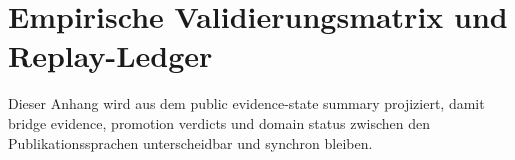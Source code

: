 \section{Empirische Validierungsmatrix und Replay-Ledger}
\label{sec:oc-core-1-3-empirical-validation-matrix-de}
\label{sec:oc-core-1-3-empirical-validation-matrix}

Dieser Anhang wird aus dem public evidence-state summary projiziert, damit bridge
evidence, promotion verdicts und domain status zwischen den
Publikationssprachen unterscheidbar und synchron bleiben.

\begingroup
\footnotesize
\RaggedRight
\sloppy
\setlength{\tabcolsep}{2pt}
\setlength{\LTleft}{0pt}
\setlength{\LTright}{0pt}

\endgroup
